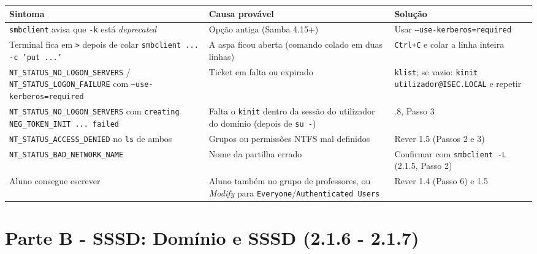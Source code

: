 \begin{center}\small
\begin{tabularx}{\linewidth}{|>{\raggedright\arraybackslash}X|>{\raggedright\arraybackslash}X|>{\raggedright\arraybackslash}X|}
\hline
\rowcolor{azul!10}\textbf{Sintoma} & \textbf{Causa provável} & \textbf{Solução} \\
\hline
\texttt{smbclient} avisa que \texttt{-k} está \emph{deprecated} & Opção antiga (Samba 4.15+) & Usar \texttt{--use-kerberos=required} \\
\hline
Terminal fica em \texttt{\textgreater{}} depois de colar \texttt{smbclient ... -c 'put ...'} & A aspa ficou aberta (comando colado em duas linhas) & \texttt{Ctrl+C} e colar a linha inteira \\
\hline
\texttt{NT\_STATUS\_NO\_LOGON\_SERVERS} / \texttt{NT\_STATUS\_LOGON\_FAILURE} com \texttt{--use-kerberos=required} & Ticket em falta ou expirado & \texttt{klist}; se vazio: \texttt{kinit utilizador@ISEC.LOCAL} e repetir \\
\hline
\texttt{NT\_STATUS\_NO\_LOGON\_SERVERS} com \texttt{creating NEG\_TOKEN\_INIT ... failed} & Falta o \texttt{kinit} dentro da sessão do utilizador do domínio (depois de \texttt{su -}) & 2.1.8, Passo 3 \\
\hline
\texttt{NT\_STATUS\_ACCESS\_DENIED} no \texttt{ls} de ambos & Grupos ou permissões NTFS mal definidos & Rever 1.5 (Passos 2 e 3) \\
\hline
\texttt{NT\_STATUS\_BAD\_NETWORK\_NAME} & Nome da partilha errado & Confirmar com \texttt{smbclient -L} (2.1.5, Passo 2) \\
\hline
Aluno consegue escrever & Aluno também no grupo de professores, ou \emph{Modify} para \texttt{Everyone}/\texttt{Authenticated Users} & Rever 1.4 (Passo 6) e 1.5 \\
\hline
\end{tabularx}
\end{center}

\label{ec-b1-sssd}

\section*{Parte B - SSSD: Domínio e SSSD (2.1.6 - 2.1.7)}

